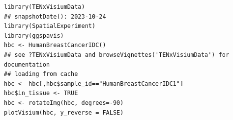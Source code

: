 
\begin{shaded}
\begin{verbatim}
library(TENxVisiumData)
## snapshotDate(): 2023-10-24
library(SpatialExperiment)
library(ggspavis)
hbc <- HumanBreastCancerIDC()
## see ?TENxVisiumData and browseVignettes('TENxVisiumData') for documentation
## loading from cache
hbc <- hbc[,hbc$sample_id=="HumanBreastCancerIDC1"]
hbc$in_tissue <- TRUE
hbc <- rotateImg(hbc, degrees=-90)
plotVisium(hbc, y_reverse = FALSE)
\end{verbatim}
\end{shaded}


